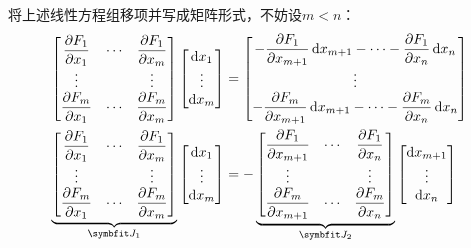 将上述线性方程组移项并写成矩阵形式，不妨设$m < n$：
\begin{align*}
    \begin{bmatrix}
        \displaystyle\pdv{F_1}{x_1} & \cdots & \displaystyle\pdv{F_1}{x_m} \\
        \vdots & & \vdots\\
        \displaystyle\pdv{F_m}{x_1} & \cdots & \displaystyle\pdv{F_m}{x_m} \\
    \end{bmatrix}\begin{bmatrix}
        \dd{x_1} \\ \vdots \\ \dd{x_m}
    \end{bmatrix} &= \begin{bmatrix}
        \displaystyle -\pdv{F_1}{x_{m+1}}\dd{x_{m+1}} -\cdots -\pdv{F_1}{x_{n}}\dd{x_{n}}\\
        \vdots \\
        \displaystyle -\pdv{F_m}{x_{m+1}}\dd{x_{m+1}} -\cdots -\pdv{F_m}{x_{n}}\dd{x_{n}}\\
    \end{bmatrix}\\
    \underbrace{\begin{bmatrix}
        \displaystyle\pdv{F_1}{x_1} & \cdots & \displaystyle\pdv{F_1}{x_m} \\
        \vdots & & \vdots\\
        \displaystyle\pdv{F_m}{x_1} & \cdots & \displaystyle\pdv{F_m}{x_m} \\
    \end{bmatrix}}_{\vb{J}_1} \begin{bmatrix}
        \dd{x_1} \\ \vdots \\ \dd{x_m}
    \end{bmatrix} &= -\underbrace{\begin{bmatrix}
        \displaystyle\pdv{F_1}{x_{m+1}} & \cdots & \displaystyle\pdv{F_1}{x_n} \\
        \vdots & & \vdots\\
        \displaystyle\pdv{F_m}{x_{m+1}} & \cdots & \displaystyle\pdv{F_m}{x_n} \\
    \end{bmatrix}}_{\vb{J}_2}\begin{bmatrix}
        \dd{x_{m+1}} \\ \vdots \\ \dd{x_n}
    \end{bmatrix}
\end{align*}
